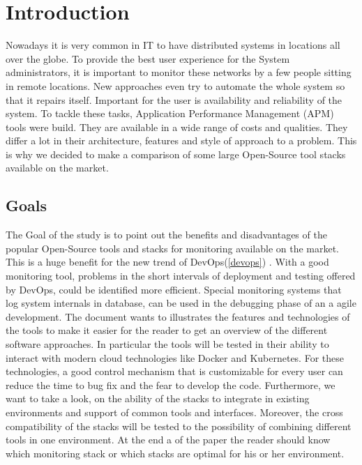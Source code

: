 
\chapter{Introduction}
Nowadays it is very common in IT to have distributed systems in locations all over the globe\cite{1687567}. To provide the best user experience for the System administrators, it is important to monitor these networks by a few people sitting in remote locations. New approaches even try to automate the whole system so that it repairs itself. Important for the user is availability and reliability of the system. 
To tackle these tasks, Application Performance Management (APM) tools were build. They are available in a wide range of costs and qualities. They differ a lot in their architecture, features and style of approach to a problem. This is why we decided to make a comparison of some large Open-Source tool stacks available on the market. 
\section{Goals}
The Goal of the study is to point out the benefits and disadvantages of the popular Open-Source tools and stacks for monitoring available on the market. This is a huge benefit for the new trend of DevOps(\cref{devops}) \cite{Bass:2015:DSA:2810087} . With a good monitoring tool, problems in the short intervals of deployment and testing offered by DevOps, could be identified more efficient. Special monitoring systems that log system internals in database, can be used in the debugging phase of an a agile development.  
The document wants to illustrates the features and technologies of the tools to make it easier for the reader to get an overview of the different software approaches. In particular the tools will be tested in their ability to interact with modern cloud technologies like Docker and Kubernetes.
For these technologies, a good control mechanism that is customizable for every user can reduce the time to bug fix and the fear to develop the code.
 Furthermore, we want to take a look, on the ability of the stacks to integrate in existing environments and support of common tools and interfaces. Moreover, the cross compatibility of the stacks will be tested to the possibility of combining different tools in one environment. At the end a of the paper the reader should know which monitoring stack or which stacks are optimal for his or her environment.  

